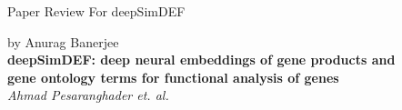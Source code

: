 \begin{center}
        
    \Large{Paper Review For deepSimDEF} \\
    \author{}{by Anurag Banerjee}\\
    
    \vspace{1em}
    \LARGE{\textbf{deepSimDEF: deep neural embeddings of gene products and\\gene ontology terms for functional analysis of genes}\cite{deepSimDEF}} \\
    \Large{\textit{Ahmad Pesaranghader et. al.}} \\

\end{center}